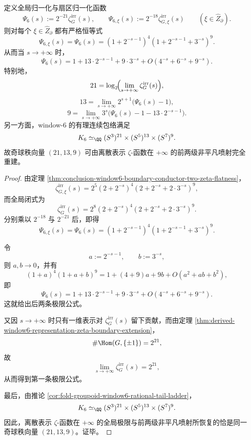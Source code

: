 \begin{theorem}\label{thm:conclusion-window6-boundary-zeta-jets-recover-odd-sphere-ranks}
定义全局归一化与扇区归一化函数
\[
\Psi_6(s):=2^{-21}\zeta^{\mathrm{irr}}_{G}(s),
\qquad
\Psi_{6,\xi}(s):=2^{-18}\zeta^{\mathrm{irr}}_{G,\xi}(s)
\qquad
(\xi\in\widehat Z_{\partial}).
\]
则对每个 \(\xi\in\widehat Z_{\partial}\) 都有严格恒等式
\[
\Psi_{6,\xi}(s)=\Psi_6(s)
=(1+2^{-s-1})^4(1+2^{-s-1}+3^{-s})^9.
\]
从而当 \(s\to+\infty\) 时，
\[
\Psi_6(s)
=
1+13\cdot 2^{-s-1}+9\cdot 3^{-s}
+O(4^{-s}+6^{-s}+9^{-s}).
\]
特别地，
\[
21=\log_2\!\Bigl(\lim_{s\to+\infty}\zeta^{\mathrm{irr}}_{G}(s)\Bigr),
\]
\[
13=\lim_{s\to+\infty}2^{s+1}\bigl(\Psi_6(s)-1\bigr),
\]
\[
9=\lim_{s\to+\infty}3^{s}\bigl(\Psi_6(s)-1-13\cdot 2^{-s-1}\bigr).
\]
另一方面，window-\(6\) 的有理连续包络满足
\[
K_6\simeq_{\QQ}(S^3)^{21}\times (S^5)^{13}\times (S^7)^9.
\]
故奇球秩向量 \((21,13,9)\) 可由离散表示 \(\zeta\)-函数在 \(+\infty\) 的前两级非平凡喷射完全重建。
\end{theorem}
\begin{proof}
由定理 \ref{thm:conclusion-window6-boundary-conductor-two-zeta-flatness}，
\[
\zeta^{\mathrm{irr}}_{G,\xi}(s)
=
2^5(2+2^{-s})^4(2+2^{-s}+2\cdot 3^{-s})^9,
\]
而全局闭式为
\[
\zeta^{\mathrm{irr}}_{G}(s)
=
2^8(2+2^{-s})^4(2+2^{-s}+2\cdot 3^{-s})^9.
\]
分别乘以 \(2^{-18}\) 与 \(2^{-21}\) 后，即得
\[
\Psi_{6,\xi}(s)=\Psi_6(s)
=(1+2^{-s-1})^4(1+2^{-s-1}+3^{-s})^9.
\]

令
\[
a:=2^{-s-1},
\qquad
b:=3^{-s},
\]
则 \(a,b\to0\)，并有
\[
(1+a)^4(1+a+b)^9
=
1+(4+9)a+9b+O(a^2+ab+b^2),
\]
即
\[
\Psi_6(s)=1+13\cdot 2^{-s-1}+9\cdot 3^{-s}+O(4^{-s}+6^{-s}+9^{-s}).
\]
这就给出后两条极限公式。

又因 \(s\to+\infty\) 时只有一维表示对 \(\zeta_G^{\mathrm{irr}}(s)\) 留下贡献，而由定理 \ref{thm:derived-window6-representation-zeta-boundary-extension}，
\[
\#\Hom(G,\{\pm1\})=2^{21},
\]
故
\[
\lim_{s\to+\infty}\zeta_G^{\mathrm{irr}}(s)=2^{21},
\]
从而得到第一条极限公式。

最后，由推论 \ref{cor:fold-groupoid-window6-rational-tail-ladder}，
\[
K_6\simeq_{\QQ}(S^3)^{21}\times (S^5)^{13}\times (S^7)^9.
\]
因此，离散表示 \(\zeta\)-函数在 \(+\infty\) 的全局极限与前两级非平凡喷射所恢复的恰是同一奇球秩向量 \((21,13,9)\)。证毕。
\end{proof}

